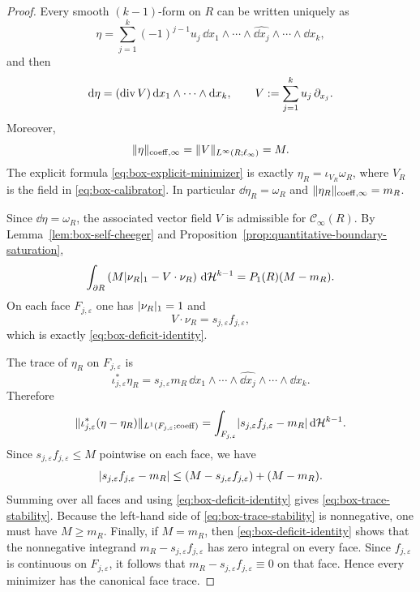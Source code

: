 \begin{proof}
Every smooth $(k-1)$-form on $R$ can be written uniquely as
\[
\eta=
\sum_{j=1}^k (-1)^{j-1}u_j\,
\dd x_1\wedge\cdots\wedge\widehat{\dd x_j}\wedge\cdots\wedge \dd x_k,
\]
and then
\[
\mathrm{d}\eta=(\operatorname{div} V)\,\mathrm{d} x_1\wedge\cdots\wedge \mathrm{d} x_k,
\qquad
V:=\sum_{j=1}^k u_j\,\partial_{x_j}.
\]
Moreover,
\[
\lVert \eta \rVert_{\mathrm{coeff},\infty}=
\lVert V \rVert_{L^\infty(R;\ell_\infty)}=M.
\]
The explicit formula \eqref{eq:box-explicit-minimizer} is exactly
$\eta_R=\iota_{V_R}\omega_R$, where $V_R$ is the field in
\eqref{eq:box-calibrator}. In particular $\dd\eta_R=\omega_R$ and
$\lVert \eta_R \rVert_{\mathrm{coeff},\infty}=m_R$.

Since $\dd\eta=\omega_R$, the associated vector field $V$ is admissible for
$\mathcal C_\infty(R)$. By Lemma~\ref{lem:box-self-cheeger} and
Proposition~\ref{prop:quantitative-boundary-saturation},
\[
\int_{\partial R}
\left(
M\lvert \nu_R \rvert_1-V\cdot \nu_R
\right)\,\mathrm{d}\mathcal{H}^{k-1}
=
P_1(R)(M-m_R).
\]
On each face $F_{j,\varepsilon}$ one has $\lvert \nu_R \rvert_1=1$ and
\[
V\cdot \nu_R=s_{j,\varepsilon}f_{j,\varepsilon},
\]
which is exactly \eqref{eq:box-deficit-identity}.

The trace of $\eta_R$ on $F_{j,\varepsilon}$ is
\[
\iota_{j,\varepsilon}^\ast\eta_R
=
s_{j,\varepsilon}m_R\,
\dd x_1\wedge\cdots\wedge\widehat{\dd x_j}\wedge\cdots\wedge \dd x_k.
\]
Therefore
\[
\lVert \iota_{j,\varepsilon}^\ast(\eta-\eta_R) \rVert_{L^1(F_{j,\varepsilon};\mathrm{coeff})}
=
\int_{F_{j,\varepsilon}}
\lvert s_{j,\varepsilon}f_{j,\varepsilon}-m_R \rvert\,\mathrm{d}\mathcal{H}^{k-1}.
\]
Since $s_{j,\varepsilon}f_{j,\varepsilon}\le M$ pointwise on each face, we
have
\[
\lvert s_{j,\varepsilon}f_{j,\varepsilon}-m_R \rvert
\le
\left(M-s_{j,\varepsilon}f_{j,\varepsilon}\right)+(M-m_R).
\]
Summing over all faces and using \eqref{eq:box-deficit-identity} gives
\eqref{eq:box-trace-stability}. Because the left-hand side of
\eqref{eq:box-trace-stability} is nonnegative, one must have $M\ge m_R$.
Finally, if $M=m_R$, then \eqref{eq:box-deficit-identity} shows that the
nonnegative integrand $m_R-s_{j,\varepsilon}f_{j,\varepsilon}$ has zero
integral on every face. Since $f_{j,\varepsilon}$ is continuous on
$F_{j,\varepsilon}$, it follows that
$m_R-s_{j,\varepsilon}f_{j,\varepsilon}\equiv 0$ on that face. Hence every
minimizer has the canonical face trace.
\end{proof}
